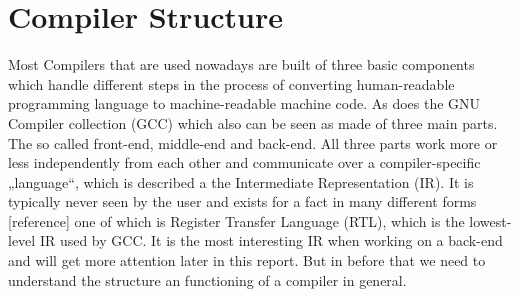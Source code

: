 \chapter{Compiler Structure}
\label{chapter:compiler structure}

Most Compilers that are used nowadays are built of three basic components which handle different steps in the process of converting human-readable programming language to machine-readable machine code. As does the GNU Compiler collection (GCC) which also can be seen as made of three main parts. The so called front-end, middle-end and back-end.
All three parts work more or less independently from each other and communicate over a compiler-specific „language“, which is described a the Intermediate Representation (IR). It is typically never seen by the user and exists for a fact in many different forms [reference] one of which is Register Transfer Language (RTL), which is the lowest-level IR used by GCC. It is the most interesting IR when working on a back-end and will get more attention later in this report. But in before that we need to understand the structure an functioning of a compiler in general.

